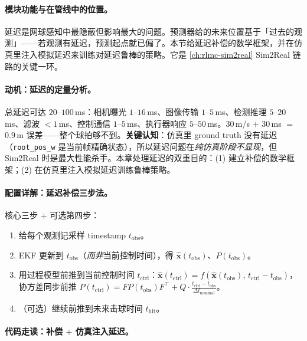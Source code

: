 \paragraph{模块功能与在管线中的位置。}延迟是网球感知中最隐蔽但影响最大的问题。预测器给的未来位置基于「过去的观测」——若观测有延迟，预测起点就已偏了。本节给延迟补偿的数学框架，并在仿真里注入模拟延迟来训练对延迟鲁棒的策略。它是 \cref{ch:rlmc-sim2real} Sim2Real 链路的关键一环。

\paragraph{动机：延迟的定量分析。}总延迟可达 $20$--$100$\,ms：相机曝光 $1$--$16$\,ms、图像传输 $1$--$5$\,ms、检测推理 $5$--$20$\,ms、滤波 $<1$\,ms、控制通信 $1$--$5$\,ms、执行器响应 $5$--$50$\,ms。$30$\,m/s $+$ $30$\,ms $=$ $0.9$\,m 误差——整个球拍够不到。\textbf{关键认知}：仿真里 ground truth 没有延迟（\verb|root_pos_w| 是当前帧精确状态），所以延迟问题在\emph{纯仿真阶段不显现}，但 Sim2Real 时是最大性能杀手。本章处理延迟的双重目的：(1) 建立补偿的数学框架；(2) 在仿真里注入模拟延迟训练鲁棒策略。

\paragraph{配置详解：延迟补偿三步法。}核心三步 $+$ 可选第四步：

\begin{enumerate}
  \item 给每个观测记采样 timestamp $t_{\text{obs}}$。
  \item EKF 更新到 $t_{\text{obs}}$（\emph{而非}当前控制时间），得 $\hat{\mathbf x}(t_{\text{obs}})$、$P(t_{\text{obs}})$。
  \item 用过程模型前推到当前控制时间 $t_{\text{ctrl}}$：$\hat{\mathbf x}(t_{\text{ctrl}})=f(\hat{\mathbf x}(t_{\text{obs}}),\,t_{\text{ctrl}}-t_{\text{obs}})$，协方差同步前推 $P(t_{\text{ctrl}})=FP(t_{\text{obs}})F^{\!\top}+Q\cdot\frac{t_{\text{ctrl}}-t_{\text{obs}}}{\Delta t_{\text{nominal}}}$。
  \item （可选）继续前推到未来击球时间 $t_{\text{hit}}$。
\end{enumerate}

\paragraph{代码走读：补偿 $+$ 仿真注入延迟。}

